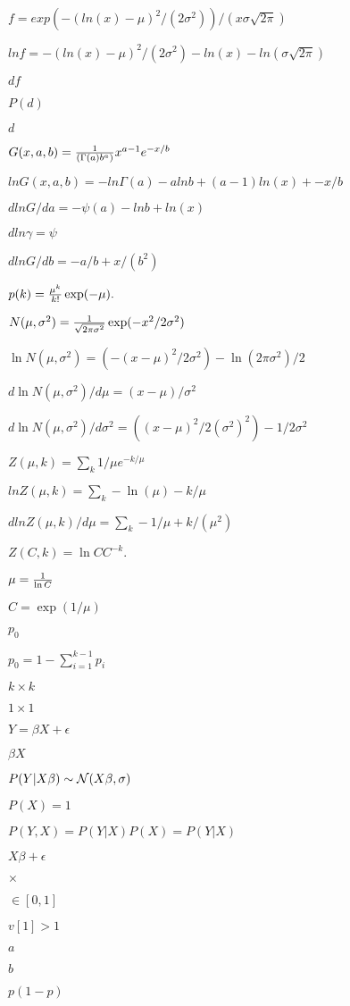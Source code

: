 \documentclass{article}
\begin{document}
$f = exp(-(ln(x)-\mu)^2/(2\sigma^2))/ (x\sigma\sqrt{2\pi})$
\pagebreak

$ln f = -(ln(x)-\mu)^2/(2\sigma^2) - ln(x) - ln(\sigma\sqrt{2\pi})$
\pagebreak

$df$
\pagebreak

$P(d)$
\pagebreak

$d$
\pagebreak

$G(x, a, b) = {1\over (\Gamma(a) b^a)} x^{a-1} e^{-x/b}$
\pagebreak

$ln G(x, a, b)= -ln \Gamma(a) - a ln b + (a-1)ln(x) + -x/b$
\pagebreak

$d ln G/ da = -\psi(a) - ln b + ln(x) $
\pagebreak

$d ln \gamma = \psi$
\pagebreak

$d ln G/ db = -a/b + x/(b^2) $
\pagebreak

$p(k) = {\mu^k \over k!} \exp(-\mu). $
\pagebreak

$N(\mu,\sigma^2) = {1 \over \sqrt{2 \pi \sigma^2}} \exp (-x^2 / 2\sigma^2)$
\pagebreak

$\ln N(\mu,\sigma^2) = (-(x-\mu)^2 / 2\sigma^2) - \ln (2 \pi \sigma^2)/2 $
\pagebreak

$d\ln N(\mu,\sigma^2)/d\mu = (x-\mu) / \sigma^2 $
\pagebreak

$d\ln N(\mu,\sigma^2)/d\sigma^2 = ((x-\mu)^2 / 2(\sigma^2)^2) - 1/2\sigma^2 $
\pagebreak

$Z(\mu,k) = \sum_k 1/\mu e^{-k/\mu} $
\pagebreak

$ln Z(\mu,k) = \sum_k -\ln(\mu) - k/\mu $
\pagebreak

$dln Z(\mu,k)/d\mu = \sum_k -1/\mu + k/(\mu^2) $
\pagebreak

$Z(C,k) = \ln C C^{-k}. $
\pagebreak

$\mu = {1\over \ln C}$
\pagebreak

$C=\exp(1/\mu)$
\pagebreak

$p_0$
\pagebreak

$p_0=1-\sum_{i=1}^{k-1} p_i$
\pagebreak

$k \times k$
\pagebreak

$1\times 1$
\pagebreak

$ Y = \beta X + \epsilon$
\pagebreak

$\beta X$
\pagebreak

$P(Y|X\beta) \sim {\cal N}(X\beta, \sigma)$
\pagebreak

$P(X)=1$
\pagebreak

$P(Y, X) = P(Y|X)P(X) = P(Y|X)$
\pagebreak

$X\beta+\epsilon$
\pagebreak

$\times$
\pagebreak

$\in[0,1]$
\pagebreak

$v[1]>1$
\pagebreak

$a$
\pagebreak

$b$
\pagebreak

$p(1-p)$
\pagebreak
\end{document}
